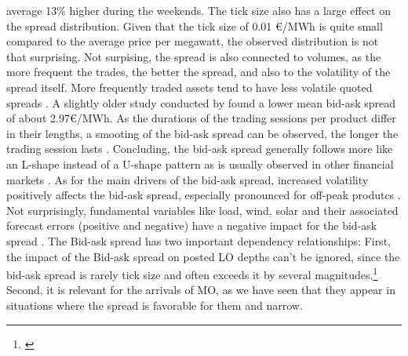 \documentclass[12pt,a4paper]{cau_thesis}
\begin{document}
average 13\% higher during the weekends. The tick size also has a
large effect on the spread distribution. Given that the tick size of
0.01 €/MWh is quite small compared to the average price per megawatt,
the observed distribution is not that surprising.
Not surpising, the spread is also connected to volumes, as the more
frequent the trades, the better the spread, and also to the
volatility of the spread itself. More frequently traded assets tend
to have less volatile quoted spreads \cite{balardy2022empirical}. A
slightly older study conducted by \cite{hagemann2013empirical} found
a lower mean bid-ask spread of about 2.97€/MWh. As the durations of
the trading sessions per product differ in their lengths, a smooting
of the bid-ask spread can be observed, the longer the trading session
lasts \cite[See ][, p.238]{balardy2022empirical}. Concluding, the
bid-ask spread generally follows more like an L-shape instead of a
U-shape pattern as is usually observed in other financial markets
\cite[See ][, p.238]{balardy2022empirical}. As for the main drivers
of the bid-ask spread, increased volatility positively affects the
bid-ask spread, especially pronounced for off-peak produtcs
\cite[See][, p.246]{balardy2022empirical}. Not surprisingly,
fundamental variables like load, wind, solar and their associated
forecast errors (positive and negative) have a negative impact for
the bid-ask spread \cite[See][, p.247]{balardy2022empirical}. The
Bid-ask spread has two important dependency relationships: First, the
impact of the Bid-ask spread on posted LO depths can't be ignored,
since the bid-ask spread is rarely tick size and often exceeds it by
several magnitudes.\footnote{\cite[See ][, p.78]{luckner2021hawkes}}
Second, it is relevant for the arrivals of MO, as we have seen that
they appear in situations where the spread is favorable for them and
narrow.
\begin{figure}[htbp]
    \vspace*{0.5cm}
    \centering
    \label{fig:intraday_spread_pattern_iqr}
\end{figure}
\end{document}
